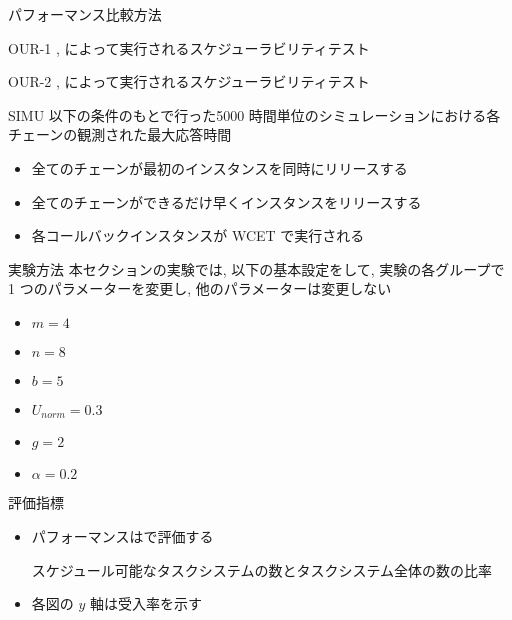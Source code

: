 \begin{frame}{パフォーマンス比較方法}
    \vspace{1mm}
    \begin{block}{OUR-1}
        ,  によって実行されるスケジューラビリティテスト
    \end{block}
    \begin{block}{OUR-2}
        ,  によって実行されるスケジューラビリティテスト
    \end{block}
    \begin{block}{SIMU}
        以下の条件のもとで行った5000 時間単位のシミュレーションにおける各チェーンの観測された最大応答時間
        \setlength{\linewidth}{0.98\columnwidth}
        \footnotesize
        \begin{itemize}
            \item 全てのチェーンが最初のインスタンスを同時にリリースする
            \item 全てのチェーンができるだけ早くインスタンスをリリースする
            \item 各コールバックインスタンスが WCET で実行される
        \end{itemize}
    \end{block}
\end{frame}

\begin{frame}{実験方法}
    本セクションの実験では, 以下の基本設定をして, 実験の各グループで 1 つのパラメーターを変更し, 他のパラメーターは変更しない
    \begin{itemize}
        \item $m=4$
        \item $n=8$
        \item $b=5$
        \item $U_{n o r m}=0.3$
        \item $g=2$
        \item $\alpha=0.2$
    \end{itemize}
\end{frame}

\begin{frame}{評価指標}
    \begin{itemize}
        \item パフォーマンスはで評価する
              \begin{definition}[受入率]
                  スケジュール可能なタスクシステムの数とタスクシステム全体の数の比率
              \end{definition}
              \vspace{5mm}
        \item 各図の $y$ 軸は受入率を示す
    \end{itemize}
\end{frame}

